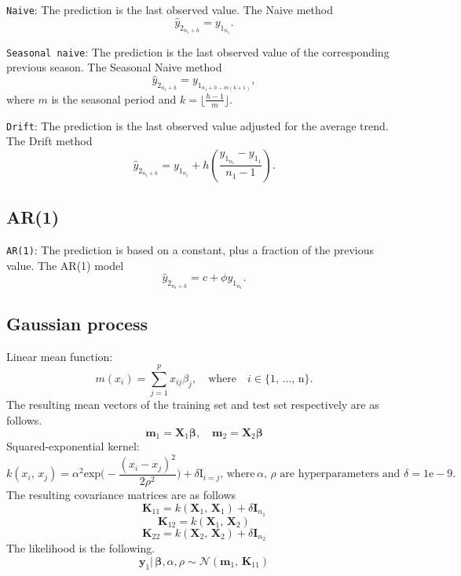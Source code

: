 \documentclass[
]{article}
\begin{document}
\texttt{Naive}: The prediction is the last observed value. The Naive
method \[\hat{y}_{2_{n_{1} + h}} = y_{1_{n_{1}}}.\]

\texttt{Seasonal\ naive}: The prediction is the last observed value of
the corresponding previous season. The Seasonal Naive method
\[\hat{y}_{2_{n_{1} + h}} = y_{1_{n_{1} + h - m (k+1)}},\] where \(m\)
is the seasonal period and \(k = \lfloor \frac{h-1}{m} \rfloor\).

\texttt{Drift}: The prediction is the last observed value adjusted for
the average trend. The Drift method
\[\hat{y}_{2_{n_{1} + h}} = y_{1_{n_{1}}} + h \left(\frac{y_{1_{{n_{1}}}} - y_{1_{1}}} {n_{1} - 1} \right).\]

\subsection{AR(1)}\label{ar1}

\texttt{AR(1)}: The prediction is based on a constant, plus a fraction
of the previous value. The AR(1) model
\[\hat{y}_{2_{n_{1} + h}} = c + \phi y_{1_{n_{1}}}.\]

\subsection{Gaussian process}\label{gaussian-process}

Linear mean function:
\[m(x_{i}) = \sum_{j=1}^{p} x_{ij}\beta_{j}, \quad \text{where} \quad i \in \{1,\, \ldots,\, \text{n}\}.\]
The resulting mean vectors of the training set and test set respectively
are as follows.
\[\mathbf{m}_{1} = \mathbf{X}_{1}\boldsymbol{\beta}, \quad \mathbf{m}_{2} = \mathbf{X}_{2}\boldsymbol{\beta}\]
Squared-exponential kernel:
\[k(x_{i},\, x_{j}) = \alpha^2 \text{exp} \bigg(-\frac{(x_{i} - x_{j})^2}{2\rho^2} \bigg) + \delta\text{I}_{i=j}, \, \text{where} \, \alpha,\, \rho \text{ are hyperparameters and } \delta = 1\text{e}-9.\]
The resulting covariance matrices are as follows
\[\mathbf{K}_{11} = k(\mathbf{X}_{1},\, \mathbf{X}_{1}) + \delta\mathbf{I}_{n_{1}}\]
\[\mathbf{K}_{12} = k(\mathbf{X}_{1},\, \mathbf{X}_{2})\]
\[\mathbf{K}_{22} = k(\mathbf{X}_{2},\, \mathbf{X}_{2}) + \delta\mathbf{I}_{n_{2}}\]
The likelihood is the following.
\[\mathbf{y}_{1}|\, \boldsymbol{\beta}, \alpha, \rho \sim \mathcal{N}(\mathbf{m}_{1},\, \mathbf{K}_{11})\]
\end{document}
